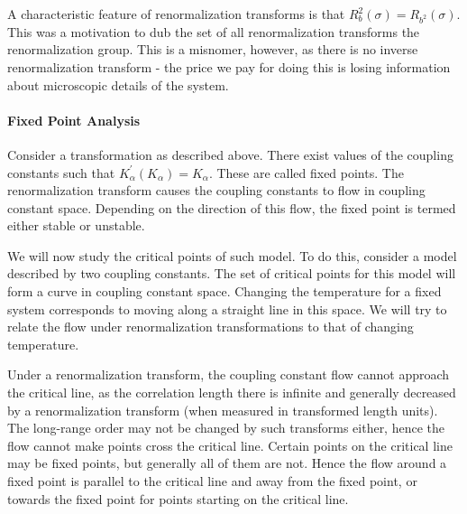 A characteristic feature of renormalization transforms is that $R_{b}^{2}(\sigma) = R_{b^{2}}(\sigma)$. This was a motivation to dub the set of all renormalization transforms the renormalization group. This is a misnomer, however, as there is no inverse renormalization transform - the price we pay for doing this is losing information about microscopic details of the system.

\paragraph{Fixed Point Analysis}
Consider a transformation as described above. There exist values of the coupling constants such that $K_{\alpha}^{\prime}(K_{\alpha}) = K_{\alpha}$. These are called fixed points. The renormalization transform causes the coupling constants to flow in coupling constant space. Depending on the direction of this flow, the fixed point is termed either stable or unstable.

We will now study the critical points of such model. To do this, consider a model described by two coupling constants. The set of critical points for this model will form a curve in coupling constant space. Changing the temperature for a fixed system corresponds to moving along a straight line in this space. We will try to relate the flow under renormalization transformations to that of changing temperature.

Under a renormalization transform, the coupling constant flow cannot approach the critical line, as the correlation length there is infinite and generally decreased by a renormalization transform (when measured in transformed length units). The long-range order may not be changed by such transforms either, hence the flow cannot make points cross the critical line. Certain points on the critical line may be fixed points, but generally all of them are not. Hence the flow around a fixed point is parallel to the critical line and away from the fixed point, or towards the fixed point for points starting on the critical line.


